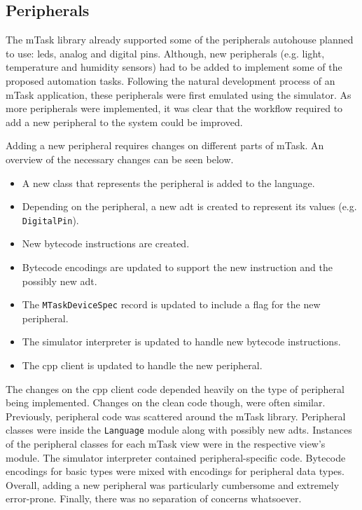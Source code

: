 \subsection{Peripherals}

The \gls{mTask} library already supported some of the peripherals \gls{autohouse} planned to use: \acsp{led}, analog and digital pins. Although, new peripherals (e.g. light, temperature and humidity sensors) had to be added to implement some of the proposed automation tasks. Following the natural development process of an \gls{mTask} application, these peripherals were first emulated using the simulator. As more peripherals were implemented, it was clear that the workflow required to add a new peripheral to the system could be improved.

Adding a new peripheral requires changes on different parts of \gls{mTask}. An overview of the necessary changes can be seen below.

\begin{itemize}
    \item A new class that represents the peripheral is added to the language. 
    \item Depending on the peripheral, a new \ac{adt} is created to represent its values (e.g. \texttt{DigitalPin}).
    \item New bytecode instructions are created.
    \item Bytecode encodings are updated to support the new instruction and the possibly new \acs{adt}.
    \item The \texttt{MTaskDeviceSpec} record is updated to include a flag for the new peripheral.
    \item The simulator interpreter is updated to handle new bytecode instructions.
    \item The \gls{cpp} client is updated to handle the new peripheral.
\end{itemize}

The changes on the \gls{cpp} client code depended heavily on the type of peripheral being implemented. Changes on the \gls{clean} code though, were often similar. Previously, peripheral code was scattered around the \gls{mTask} library. Peripheral classes were inside the \texttt{Language} module along with possibly new \acsp{adt}. Instances of the peripheral classes for each \gls{mTask} view were in the respective view's module. The simulator interpreter contained peripheral-specific code. Bytecode encodings for basic types were mixed with encodings for peripheral data types. Overall, adding a new peripheral was particularly cumbersome and extremely error-prone. Finally, there was no separation of concerns whatsoever.

